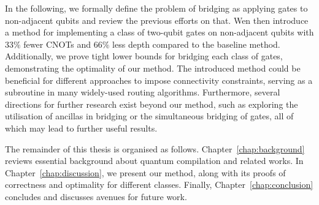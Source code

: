 In the following, we formally define the problem of bridging as applying gates to non-adjacent qubits and review the previous efforts on that. Wen then introduce a method for implementing a class of two-qubit gates on non-adjacent qubits with $33\%$ fewer CNOTs and $66\%$ less depth compared to the baseline method. Additionally, we prove tight lower bounds for bridging each class of gates, demonstrating the optimality of our method. The introduced method could be beneficial for different approaches to impose connectivity constraints, serving as a subroutine in many widely-used routing algorithms. Furthermore, several directions for further research exist beyond our method, such as exploring the utilisation of ancillas in bridging or the simultaneous bridging of gates, all of which may lead to further useful results.

The remainder of this thesis is organised as follows. Chapter~\ref{chap:background} reviews essential background about quantum compilation and related works. In Chapter~\ref{chap:discussion}, we present our method, along with its proofs of correctness and optimality for different classes. Finally, Chapter~\ref{chap:conclusion} concludes and discusses avenues for future work.